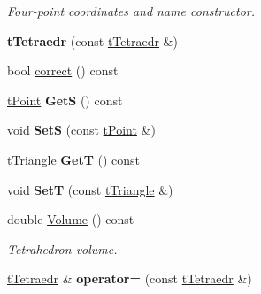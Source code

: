 \begin{DoxyCompactItemize}
\begin{DoxyCompactList}\small\item\em Four-\/point coordinates and name constructor. \end{DoxyCompactList}\item 
\mbox{\label{classtTetraedr_afd21d86cdbebaf0cd0ce7ad2869a7011}} 
{\bfseries t\+Tetraedr} (const \hyperlink{classtTetraedr}{t\+Tetraedr} \&)
\item 
bool \hyperlink{classtTetraedr_aa8b4ca43b819c0431fb28673b978d3c8}{correct} () const
\item 
\mbox{\label{classtTetraedr_a897b074d2ee556801ba905e123a0f1e9}} 
\hyperlink{classtPoint}{t\+Point} {\bfseries GetS} () const
\item 
\mbox{\label{classtTetraedr_acd33af5079b8e6703b582144dca12b96}} 
void {\bfseries SetS} (const \hyperlink{classtPoint}{t\+Point} \&)
\item 
\mbox{\label{classtTetraedr_aab5ca30306a1915b174bcb6e248f4cae}} 
\hyperlink{classtTriangle}{t\+Triangle} {\bfseries GetT} () const
\item 
\mbox{\label{classtTetraedr_aa7af31f49c73f7ec04cb350723ebfb40}} 
void {\bfseries SetT} (const \hyperlink{classtTriangle}{t\+Triangle} \&)
\item 
\mbox{\label{classtTetraedr_a7acaaa1f874fcff2d52a233297e96217}} 
double \hyperlink{classtTetraedr_a7acaaa1f874fcff2d52a233297e96217}{Volume} () const
\begin{DoxyCompactList}\small\item\em Tetrahedron volume. \end{DoxyCompactList}\item 
\mbox{\label{classtTetraedr_a1460b237b37015925bb2da797574d364}} 
\hyperlink{classtTetraedr}{t\+Tetraedr} \& {\bfseries operator=} (const \hyperlink{classtTetraedr}{t\+Tetraedr} \&)
\end{DoxyCompactItemize}
